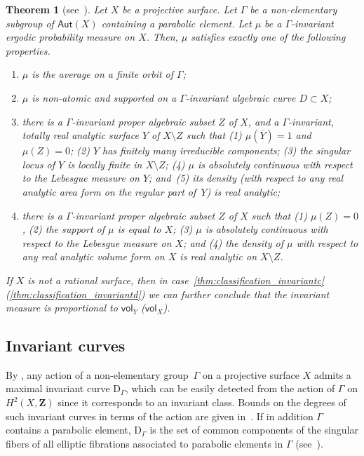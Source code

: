 \documentclass[JEP,XML,SOM,Unicode,published]{cedram}
\newenvironment{enumeratea}
{\bgroup\def\theenumi{\alph{enumi}}\begin{enumerate}}
{\end{enumerate}\egroup}
\def\Z{\mathbf{Z}}
\newcommand\Aut{\mathsf{Aut}}
\newcommand{\vol}{{\mathsf{vol}}}
\theoremstyle{plain}
\newtheorem{thm}{Theorem}[section]
\theoremstyle{definition}
\begin{document}
\begin{thm}[{see~\cite[Th.\,A]{invariant}}]\label{thm:classification_invariant}
Let $X$ be a projective surface. Let $\Gamma$ be a non-elementary subgroup of $\Aut(X)$ containing a parabolic element. Let $\mu$ be a $\Gamma$-invariant ergodic probability measure on $X$.
Then, $\mu$ satisfies exactly one of the following properties.

\begin{enumeratea}
\item\label{thm:classification_invarianta} $\mu$ is the average on a finite orbit of $\Gamma$;
\item\label{thm:classification_invariantb} $\mu$ is non-atomic and supported on a $\Gamma$-invariant algebraic curve $D\subset X$;
\item\label{thm:classification_invariantc} there is a $\Gamma$-invariant proper algebraic subset $Z$ of $X$, and a $\Gamma$-invariant,
totally real analytic surface $Y$ of
$X\setminus Z$ such that {\em {(1)}} $\mu(\overline{Y}) = 1$ and $\mu(Z)=0$; {\em {(2)}} $Y$ has finitely many irreducible components;
{\em {(3)}} the singular locus of $Y$ is locally finite in $X\setminus Z$;
{\em {(4)}} $\mu$
is absolutely continuous with respect to the Lebesgue measure on $Y$; and~{\em {(5)}} its density (with respect to any real analytic area form on the regular part of~$Y$)
is real analytic;
\item\label{thm:classification_invariantd} there is a $\Gamma$-invariant proper algebraic subset $Z$ of $X$ such that {\em {(1)}} $\mu(Z)=0$, {\em {(2)}} the support of $\mu$ is equal to $X$; {\em {(3)}} $\mu$ is absolutely continuous with respect to the Lebesgue measure on $X$; and {\em {(4)}} the density of $\mu$ with respect to any real analytic
volume form on $X$ is real analytic on $X\setminus Z$.
\end{enumeratea}
If $X$ is not a rational surface, then in case~\eqref{thm:classification_invariantc} (\resp \eqref{thm:classification_invariantd}) we can further conclude that the invariant measure is proportional to $\vol_Y$ (\resp $\vol_X$).
\end{thm}

\subsection{Invariant curves}\label{subs:invariant_curves}
By \cite[Lem.\,2.12]{stiffness}, any action of a non-elementary group~$\Gamma$ on a
projective surface $X$ admits a maximal invariant curve $\mathrm D_\Gamma$,
which can be easily detected from the action of $\Gamma$ on $H^2(X, \Z)$
since it corresponds to an invariant class. Bounds on the degrees of such invariant curves in terms of the action are given in~\hbox{\cite[\S 3]{finite_orbits}}. If in addition $\Gamma$
contains a parabolic element, $\mathrm D_\Gamma$ is the set of common components of the singular fibers of all elliptic fibrations associated to
parabolic elements in $\Gamma$ (see~\cite[\S 4.1]{invariant}).
\end{document}
